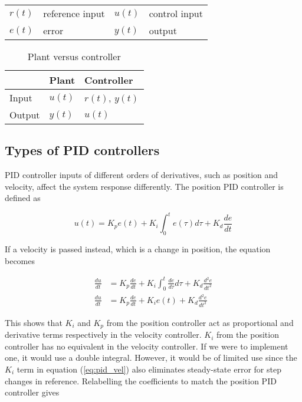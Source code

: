 \begin{table}[ht]
  \renewcommand{\arraystretch}{1.3}
  \centering
  \begin{tabulary}{\linewidth}{LLLL}
    $r(t)$ & \gls{reference} input & $u(t)$ & control input \\
    $e(t)$ & error & $y(t)$ & \gls{output} \\
  \end{tabulary}
  \label{tab:pid_def}
\end{table}

\begin{table}[ht]
  \caption{Plant versus controller}
  \renewcommand{\arraystretch}{1.3}
  \centering
  \begin{tabular}{|l|ll|}
    \hline
    \rowcolor{lightblue}
    & \textbf{Plant} & \textbf{Controller} \\
    \hline
    Input & $u(t)$ & $r(t)$, $y(t)$ \\
    Output & $y(t)$ & $u(t)$ \\
    \hline
  \end{tabular}
  \label{tab:plant_v_controller}
\end{table}

\subsection{Types of PID controllers}

PID controller inputs of different orders of derivatives, such as position and
velocity, affect the \gls{system} response differently. The position PID
controller is defined as

\begin{equation}
  u(t) = K_p e(t) + K_i \int_0^t e(\tau) d\tau + K_d \frac{de}{dt}
\end{equation}

If a velocity is passed instead, which is a change in position, the equation
becomes

\begin{align}
  \frac{du}{dt} &= K_p \frac{de}{dt} + K_i \int_0^t \frac{de}{d\tau} d\tau +
    K_d \frac{d^2e}{dt^2} \nonumber \\
  \frac{du}{dt} &= K_p \frac{de}{dt} + K_i e(t) + K_d \frac{d^2e}{dt^2}
    \label{eq:pid_vel}
\end{align}

This shows that $K_i$ and $K_p$ from the position controller act as proportional
and derivative terms respectively in the velocity controller. $K_i$ from the
position controller has no equivalent in the velocity controller. If we were to
implement one, it would use a double integral. However, it would be of limited
use since the $K_i$ term in equation (\ref{eq:pid_vel}) also eliminates
steady-state error for step changes in \gls{reference}. Relabelling the
coefficients to match the position PID controller gives

